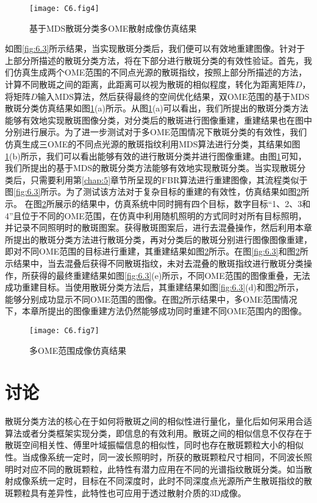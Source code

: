 \begin{figure}[htp!]
	\centering
	\texttt{[image: C6.fig4]}
	\caption{基于MDS散斑分类多OME散射成像仿真结果}
	\label{fig:6.4}
\end{figure}

如图\ref{fig:6.3}所示结果，当实现散斑分类后，我们便可以有效地重建图像。针对于上部分所描述的散斑分类方法，将在下部分进行散斑分类的有效性验证。首先，我们仿真生成两个OME范围的不同点光源的散斑指纹，按照上部分所描述的方法，计算不同散斑之间的距离，此距离可以视为散斑的相似程度，转化为距离矩阵$D$，将矩阵$D$输入MDS算法，然后获得最终的空间优化结果，双OME范围的基于MDS散斑分类仿真结果如图\ref{fig:6.4}(a)所示。从图\ref{fig:6.4}(a)可以看出，我们所提出的散斑分类方法能够有效地实现散斑图像分类，对分类后的散斑进行图像重建，重建结果也在图中分别进行展示。为了进一步测试对于多OME范围情况下散斑分类的有效性，我们仿真生成三OME的不同点光源的散斑指纹利用MDS算法进行分类，其结果如图\ref{fig:6.4}(b)所示，我们可以看出能够有效的进行散斑分类并进行图像重建。由图\ref{fig:6.4}可知，我们所提出的基于MDS的散斑分类方法能够有效地实现散斑分类。当实现散斑分类后，只需要利用第\ref{chap:5}章节所呈现的FBR算法进行重建图像，其流程类似于图\ref{fig:6.3}所示。为了测试该方法对于复杂目标的重建的有效性，仿真结果如图\ref{fig:6.7}所示。
在图\ref{fig:6.7}所展示的结果中，仿真系统中同时拥有四个目标，数字目标“1、2、3和4”且位于不同的OME范围，在仿真中利用随机照明的方式同时对所有目标照明，并记录不同照明时的散斑图案。获得散斑图案后，进行去混叠操作，然后利用本章所提出的散斑分类方法进行散斑分类，再对分类后的散斑分别进行图像图像重建，即对不同OME范围的目标进行重建，其重建结果如图\ref{fig:6.7}所示。在图\ref{fig:6.3}和图\ref{fig:6.7}所示结果中，当去混叠后获得不同散斑指纹，未对去混叠的散斑指纹进行散斑分类操作，所获得的最终重建结果如图\ref{fig:6.3}(e)所示，不同OME范围的图像重叠，无法成功重建目标。当使用散斑分类方法后，其重建结果如图\ref{fig:6.3}(d)和图\ref{fig:6.7}所示，能够分别成功显示不同OME范围的图像。在图\ref{fig:6.7}所示结果中，多OME范围情况下，本章所提出的图像重建方法仍然能够成功同时重建不同OME范围内的图像。

\begin{figure}[htp]
	\centering
	\texttt{[image: C6.fig7]}
	\caption{多OME范围成像仿真结果}
	\label{fig:6.7}
\end{figure}


\section{讨论}

散斑分类方法的核心在于如何将散斑之间的相似性进行量化，量化后如何采用合适算法或者分类框架实现分类，即信息的有效利用。散斑之间的相似信息不仅存在于散斑空间相关性、傅里叶域振幅信息的相似性，同时也存在散斑颗粒大小的相似性。当成像系统一定时，同一波长照明时，所获的散斑颗粒尺寸相同，不同波长照明时对应不同的散斑颗粒，此特性有潜力应用在不同的光谱指纹散斑分类。如当散射成像系统一定时，目标在不同深度时，此时不同深度点光源所产生散斑指纹的散斑颗粒具有差异性，此特性也可应用于透过散射介质的3D成像。

